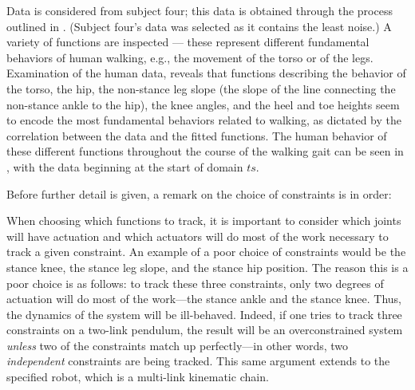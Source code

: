 Data is considered from subject four; this data is obtained through the process outlined in . (Subject four's data was selected as it contains the least noise.) A variety of functions are inspected --- these represent different fundamental behaviors of human walking, e.g., the movement of the torso or of the legs. Examination of the human data, reveals that functions describing the behavior of the torso, the hip, the non-stance leg slope (the slope of the line connecting the non-stance ankle to the hip), the knee angles, and the heel and toe heights seem to encode the most fundamental behaviors related to walking, as dictated by the correlation between the data and the fitted functions. The human behavior of these different functions throughout the course of the walking gait can be seen in , with the data beginning at the start of domain $ts$.


Before further detail is given, a remark on the choice of constraints is in order:
\begin{remark} \label{rmk:actuation}
  When choosing which functions to track, it is important to consider which joints will have actuation and which actuators will do most of the work necessary to track a given constraint. An example of a poor choice of constraints would be the stance knee, the stance leg slope, and the stance hip position. The reason this is a poor choice is as follows: to track these three constraints, only two degrees of actuation will do most of the work---the stance ankle and the stance knee. Thus, the dynamics of the system will be ill-behaved. Indeed, if one tries to track three constraints on a two-link pendulum, the result will be an overconstrained system {\em unless} two of the constraints match up perfectly---in other words, two {\em independent} constraints are being tracked. This same argument extends to the specified robot, which is a multi-link kinematic chain.
\end{remark}

